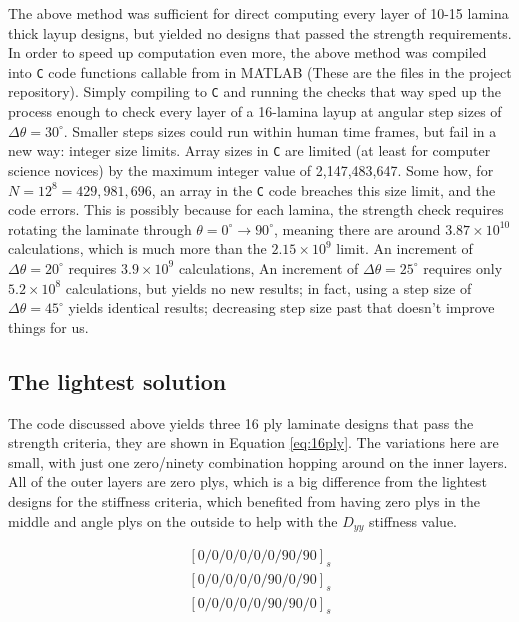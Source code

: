 \documentclass[12pt]{article}
\begin{document}
The above method was sufficient for direct computing every layer of 10-15 lamina thick layup designs, but yielded no designs that passed the strength requirements. In order to speed up computation even more, the above method was compiled into \texttt{C} code functions callable from in MATLAB (These are the  files in the project repository). Simply compiling to \texttt{C} and running the checks that way sped up the process enough to check every layer of a 16-lamina layup at angular step sizes of $\Delta \theta = 30^\circ$. Smaller steps sizes could run within human time frames, but fail in a new way: integer size limits. Array sizes in \texttt{C} are limited (at least for computer science novices) by the maximum integer value of 2,147,483,647. Some how, for $N = 12^8 = 429,981,696$, an array in the \texttt{C} code breaches this size limit, and the code errors. This is possibly because for each lamina, the strength check requires rotating the laminate through $\theta = 0^\circ\rightarrow90^\circ$, meaning there are around $3.87\times10^{10}$ calculations, which is much more than the $2.15\times10^9$ limit. An increment of $\Delta \theta = 20^\circ$ requires $3.9\times10^9$ calculations, An increment of $\Delta \theta = 25^\circ$ requires only $5.2\times 10^8$ calculations, but yields no new results; in fact, using a step size of $\Delta \theta = 45^\circ$ yields identical results; decreasing step size past that doesn't improve things for us.

\subsection{The lightest solution}

The code discussed above yields three 16 ply laminate designs that pass the strength criteria, they are shown in Equation \ref{eq:16ply}. The variations here are small, with just one zero/ninety combination hopping around on the inner layers. All of the outer layers are zero plys, which is a big difference from the lightest designs for the stiffness criteria, which benefited from having zero plys in the middle and angle plys on the outside to help with the $D_{yy}$ stiffness value.

\begin{equation}
    \begin{aligned}
        [0/0/0/0/0/0/90/90]_s \\
        [0/0/0/0/0/90/0/90]_s \\
        [0/0/0/0/0/90/90/0]_s
        \label{eq:16ply} 
    \end{aligned}
\end{equation}
\end{document}
